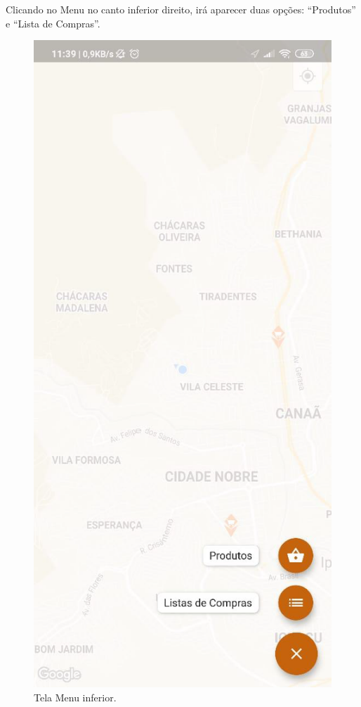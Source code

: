 Clicando no Menu no canto inferior direito, irá aparecer duas opções: “Produtos” e “Lista de Compras”.
\begin{figure}[H]
    \centering
    \caption{Tela Menu inferior.}
    \includegraphics[scale=0.3]{Imagens/Print02.png}
\end{figure}



